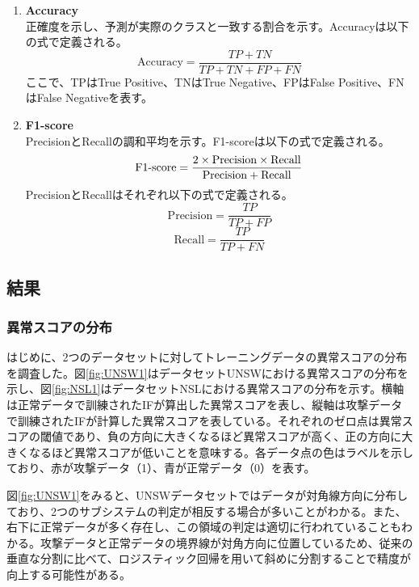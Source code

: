 \documentclass{css}
\begin{document}
\begin{enumerate}
    \item \textbf{Accuracy}\\
        正確度を示し、予測が実際のクラスと一致する割合を示す。Accuracyは以下の式で定義される。
        \begin{equation}
            \mathrm{Accuracy} = \frac{TP + TN}{TP + TN + FP + FN}
        \end{equation}
        ここで、TPはTrue Positive、TNはTrue Negative、FPはFalse Positive、FNはFalse Negativeを表す。
    
    \item \textbf{F1-score}\\
        PrecisionとRecallの調和平均を示す。F1-scoreは以下の式で定義される。
        \begin{equation}
            \mathrm{F1\mathchar`-score} = \frac{2 \times \mathrm{Precision} \times \mathrm{Recall}}{\mathrm{Precision} + \mathrm{Recall}}
        \end{equation}
        PrecisionとRecallはそれぞれ以下の式で定義される。
        \begin{equation}
            \mathrm{Precision} = \frac{TP}{TP + FP}
        \end{equation}
        \begin{equation}
            \mathrm{Recall} = \frac{TP}{TP + FN}
        \end{equation}
\end{enumerate}

\subsection{結果}

\subsubsection{異常スコアの分布}
はじめに、2つのデータセットに対してトレーニングデータの異常スコアの分布を調査した。図\ref{fig:UNSW1}はデータセットUNSWにおける異常スコアの分布を示し、図\ref{fig:NSL1}はデータセットNSLにおける異常スコアの分布を示す。横軸は正常データで訓練されたIFが算出した異常スコアを表し、縦軸は攻撃データで訓練されたIFが計算した異常スコアを表している。それぞれのゼロ点は異常スコアの閾値であり、負の方向に大きくなるほど異常スコアが高く、正の方向に大きくなるほど異常スコアが低いことを意味する。各データ点の色はラベルを示しており、赤が攻撃データ（1）、青が正常データ（0）を表す。

図\ref{fig:UNSW1}をみると、UNSWデータセットではデータが対角線方向に分布しており、2つのサブシステムの判定が相反する場合が多いことがわかる。また、右下に正常データが多く存在し、この領域の判定は適切に行われていることもわかる。攻撃データと正常データの境界線が対角方向に位置しているため、従来の垂直な分割に比べて、ロジスティック回帰を用いて斜めに分割することで精度が向上する可能性がある。
\end{document}
